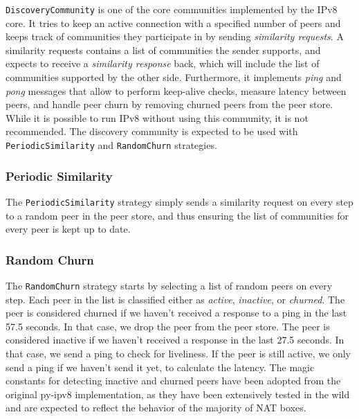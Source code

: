\texttt{DiscoveryCommunity} is one of the core communities implemented by the IPv8 core. It tries to keep an active connection with a specified number of peers and keeps track of communities they participate in by sending \textit{similarity requests}. A similarity requests contains a list of communities the sender supports, and expects to receive a \textit{similarity response} back, which will include the list of communities supported by the other side. Furthermore, it implements \textit{ping} and \textit{pong} messages that allow to perform keep-alive checks, measure latency between peers, and handle peer churn by removing churned peers from the peer store. While it is possible to run IPv8 without using this community, it is not recommended. The discovery community is expected to be used with \texttt{PeriodicSimilarity} and \texttt{RandomChurn} strategies.

\subsubsection{Periodic Similarity}

The \texttt{PeriodicSimilarity} strategy simply sends a similarity request on every step to a random peer in the peer store, and thus ensuring the list of communities for every peer is kept up to date.

\subsubsection{Random Churn}

The \texttt{RandomChurn} strategy starts by selecting a list of random peers on every step. Each peer in the list is classified either as \textit{active}, \textit{inactive}, or \textit{churned}. The peer is considered churned if we haven't received a response to a ping in the last 57.5 seconds. In that case, we drop the peer from the peer store. The peer is considered inactive if we haven't received a response in the last 27.5 seconds. In that case, we send a ping to check for liveliness. If the peer is still active, we only send a ping if we haven't send it yet, to calculate the latency. The magic constants for detecting inactive and churned peers have been adopted from the original py-ipv8 implementation, as they have been extensively tested in the wild and are expected to reflect the behavior of the majority of NAT boxes. \cite{nat_wild}



